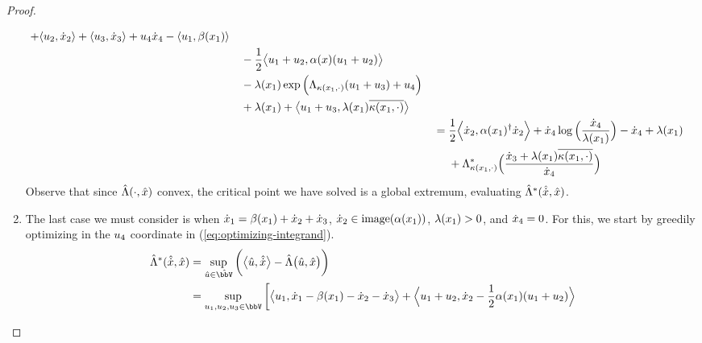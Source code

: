 \begin{proof}
\begin{enumerate}
\begin{align*}
\begin{aligned}[t]
          + {\langle u_2 , \dot{x}_2 \rangle} 
          + {\langle u_3 , \dot{x}_3 \rangle} 
          + u_4\dot{x}_4
          - {\langle u_1 , \beta(x_1) \rangle}  \\
          &\quad- \frac12{\big\langle u_1+u_2 , \alpha(x)(u_1+u_2) \big\rangle} \\
          &\quad- \lambda(x_1)\exp\Big(\Lambda_{\kappa(x_1,\cdot)}(u_1+u_3) + u_4\Big) \\
          &\quad+ \lambda(x_1) 
          + {\big\langle u_1+u_3 , \lambda(x_1)\overline{\kappa(x_1,\cdot)} \big\rangle}
        \end{aligned} \\
        &= \begin{aligned}[t]
          &\frac12{\Big\langle \dot{x}_2 , \alpha(x_1)^\dagger\dot{x}_2 \Big\rangle} + \dot{x}_4 \log\Big(\frac{\dot{x}_4}{\lambda(x_1)}\Big) - \dot{x}_4 + \lambda(x_1) \\
          &+ \Lambda_{\kappa(x_1,\cdot)}^*\Big(\frac{\dot{x}_3+\lambda(x_1)\overline{\kappa(x_1,\cdot)}}{\dot{x}_4}\Big)
        \end{aligned}
      \end{align*}
      Observe that since $\hat{\Lambda}(\cdot,\hat{x})$ convex, the critical point we have solved is a global extremum, evaluating $\hat{\Lambda}^*(\hat{\dot{x}},\hat{x})$.
    \item
      The last case we must consider is when $\dot{x}_1 = \beta(x_1) + \dot{x}_2 + \dot{x}_3$, $\dot{x}_2 \in \operatorname{image}(\alpha(x_1))$, $\lambda(x_1) > 0$, and $\dot{x}_4 = 0$.
      For this, we start by greedily optimizing in the $u_4$ coordinate in (\ref{eq:optimizing-integrand}).
      \begin{align*}
        \hat\ode^*(\hat{\diffVar}, \hat\stateVar) 
        &= \sup_{\hat\momentVar \in \hat\vecSpace} \bigg( \bprj{\hat\momentVar}{\hat\diffVar} - \hat\ode\big(\hat\momentVar, \hat\stateVar\big) \bigg)  \\
        &= \sup_{\momentVar_1,\momentVar_2,\momentVar_3 \in \vecSpace} \bigg[ \begin{aligned}[t]
          & \bprj{\momentVar_1}{\diffVar_1 - \affDrift(\stateVar_1) - \diffVar_2 - \diffVar_3} 
          + \Bprj{\momentVar_1+\momentVar_2}{\diffVar_2 
          - \frac12\affDiff(\stateVar_1)(\momentVar_1+\momentVar_2)} \\

\end{aligned}
\end{align*}
\end{enumerate}
\end{proof}
